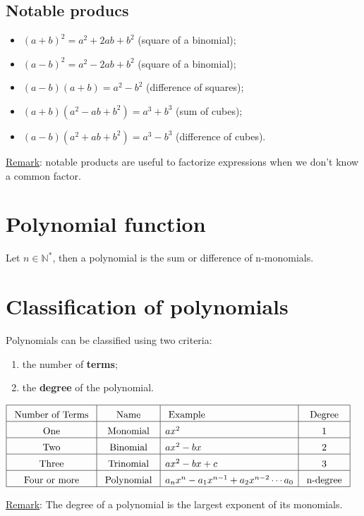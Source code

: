 \documentclass{article}
\newcommand{\rem}{\underline{Remark}: }
\begin{document}
\subsection{Notable producs}
\begin{itemize}
    \item $(a+b)^2=a^2+2ab+b^2$ (square of a binomial);
    \item $(a-b)^2=a^2-2ab+b^2$ (square of a binomial);
    \item $(a-b)(a+b)=a^2-b^2$ (difference of squares);
    \item $(a+b)(a^2-ab+b^2)=a^3+b^3$ (sum of cubes);
    \item $(a-b)(a^2+ab+b^2)=a^3-b^3$ (difference of cubes).
\end{itemize}

\underline{Remark}: notable products are useful to factorize expressions when we don't know a common factor.

\newpage
\section{Polynomial function}
Let $n \in \mathbb{N^*}$, then a polynomial is the sum or difference of n-monomials. 

\section{Classification of polynomials}
Polynomials can be classified using two criteria: 
\begin{enumerate}
    \item the number of \textbf{terms};
    \item the \textbf{degree} of the polynomial.
\end{enumerate}
\begin{center}
    $\begin{aligned}
        &\begin{array}{|c|c|l|c|}
        \hline \rule{0pt}{13pt} \text { Number of Terms } & \text { Name } & \text { Example } & \text { Degree } \\
        \hline \rule{0pt}{13pt} \text { One } & \text { Monomial } & ax^2 & \text { 1 } \\
        \hline \rule{0pt}{13pt} \text { Two } & \text { Binomial } & ax^2-b x & \text { 2 } \\
        \hline \rule{0pt}{13pt} \text { Three } & \text { Trinomial } & ax^2-b x+c & \text { 3 } \\
        \hline \rule{0pt}{13pt} \text { Four or more } & \text { Polynomial } & a_n x^n-a_1 x^{n-1}+a_2x^{n-2}\cdots a_0& \text { n-degree } \\
        \hline
        \end{array}
    \end{aligned}$
\end{center}
\vspace*{.3cm}
\rem{The degree of a polynomial is the largest exponent of its monomials.}
\end{document}
